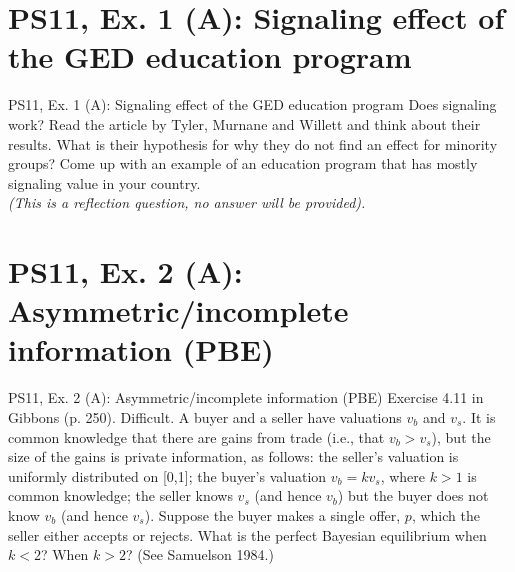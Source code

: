 \section{PS11, Ex. 1 (A): Signaling effect of the GED education program}

\begin{frame}{PS11, Ex. 1 (A): Signaling effect of the GED education program}
    Does signaling work? Read the article by Tyler, Murnane and Willett and think about
    their results. What is their hypothesis for why they do not find an effect for minority groups? Come up with an example of an education program that has mostly signaling value in your country.\\\medskip
    \textit{(This is a reflection question, no answer will be provided).}
    \vfill\null
\end{frame}



\section{PS11, Ex. 2 (A): Asymmetric/incomplete information (PBE)}

\begin{frame}{PS11, Ex. 2 (A): Asymmetric/incomplete information (PBE)}
    Exercise 4.11 in Gibbons (p. 250). Difficult. A buyer and a seller have valuations $v_b$ and $v_s$. It is common knowledge that there are gains from trade (i.e., that $v_b > v_s$), but the size of the gains is private information, as follows: the seller’s valuation is uniformly distributed on [0,1]; the buyer’s valuation $v_b = kv_s$, where $k > 1$ is common knowledge; the seller knows $v_s$ (and hence $v_b$) but the buyer does not know $v_b$ (and hence $v_s$). Suppose the buyer makes a single offer, $p$, which the seller either accepts or rejects. What is the perfect Bayesian equilibrium when $k < 2$? When $k > 2$? (See Samuelson 1984.)
    \vfill\null
\end{frame}


